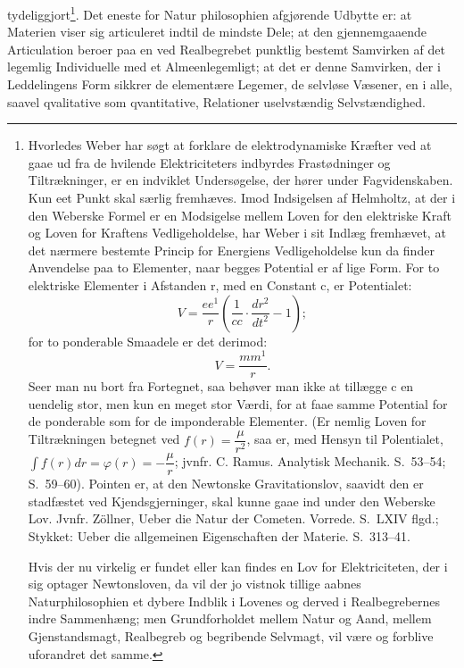 \documentclass[12pt,a4paper]{book}
\begin{document}
tydeliggjort\footnote{%
Hvorledes Weber har søgt at forklare de elektrodynamiske Kræfter ved
at gaae ud fra de hvilende Elektriciteters indbyrdes Frastødninger og
Tiltrækninger, er en indviklet Undersøgelse, der hører under
Fagvidenskaben. Kun eet Punkt skal særlig fremhæves. Imod Indsigelsen
af Helmholtz, at der i den Weberske Formel er en Modsigelse mellem
Loven for den elektriske Kraft og Loven for Kraftens Vedligeholdelse,
har Weber i sit Indlæg fremhævet, at det nærmere bestemte Princip for
Energiens Vedligeholdelse kun da finder Anvendelse paa to Elementer,
naar begges Potential er af lige Form. For to elektriske Elementer i
Afstanden r, med en Constant c, er Potentialet:
\[
V = \frac{ee^{1}}{r}\left(\frac{1}{cc}\cdot\frac{dr^{2}}{dt^{2}} - 1\right);
\]
for to ponderable Smaadele er det derimod:
\[
V = \frac{mm^{1}}{r}.
\]
Seer man nu bort fra Fortegnet, saa behøver man ikke at tillægge c en
uendelig stor, men kun en meget stor Værdi, for at faae samme
Potential for de ponderable som for de imponderable Elementer. (Er
nemlig Loven for Tiltrækningen betegnet ved $f(r) = \dfrac{\mu}{r^{2}}$,
saa er, med Hensyn til Polentialet,
$\int f(r)dr = \varphi(r) = - \dfrac{\mu}{r}$; jvnfr. C. Ramus.
Analytisk Mechanik. S.\ 53--54; S.\ 59--60). Pointen er, at den
Newtonske Gravitationslov, saavidt den er stadfæstet ved
Kjendsgjerninger, skal kunne gaae ind under den Weberske Lov. Jvnfr.
Zöllner, Ueber die Natur der Cometen. Vorrede. S.\ LXIV flgd.;
Stykket: Ueber die allgemeinen Eigenschaften der Materie.
S.\ 313--41.

Hvis der nu virkelig er fundet eller kan findes en Lov for
Elektriciteten, der i sig optager Newtonsloven, da vil der jo vistnok
tillige aabnes Naturphilosophien et dybere Indblik i Lovenes og derved
i Realbegrebernes indre Sammenhæng; men Grundforholdet mellem Natur og
Aand, mellem Gjenstandsmagt, Realbegreb og begribende Selvmagt, vil
være og forblive uforandret det samme.}. Det eneste for Natur\-%
philosophien afgjørende Udbytte er: at Materien viser sig articuleret
indtil de mindste Dele; at den gjennemgaaende Articulation beroer paa
en ved Realbegrebet punktlig bestemt Samvirken af det legemlig
Individuelle med et Almeenlegemligt; at det er denne Samvirken, der i
Leddelingens Form sikkrer de elementære Legemer, de selvløse Væsener,
en i alle, saavel qvalitative som qvantitative, Relationer
uselvstændig Selvstændighed.
\end{document}
